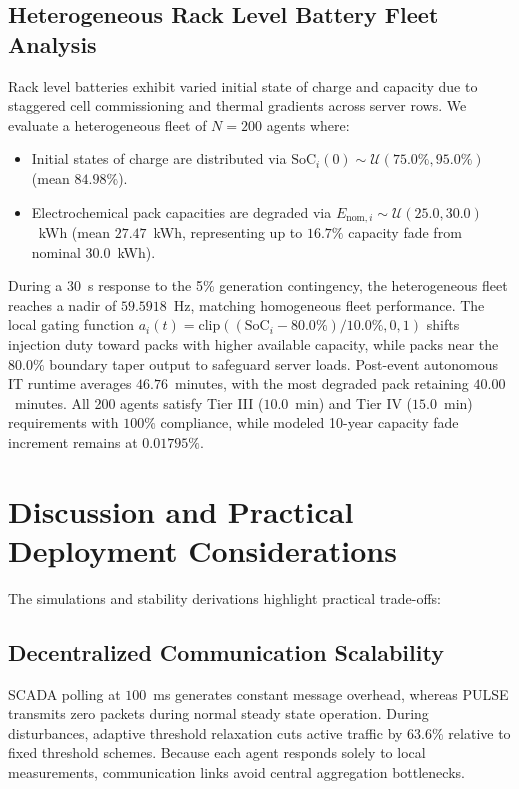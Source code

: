 \documentclass[preprint,12pt]{elsarticle}
\begin{document}
\subsection{Heterogeneous Rack Level Battery Fleet Analysis}
\label{sec:res_exp_b}

Rack level batteries exhibit varied initial state of charge and capacity due to staggered cell commissioning and thermal gradients across server rows. We evaluate a heterogeneous fleet of $N=200$ agents where:
\begin{itemize}
    \item Initial states of charge are distributed via $\mathrm{SoC}_{i}(0) \sim \mathcal{U}(75.0\%, 95.0\%)$ (mean $84.98\%$).
    \item Electrochemical pack capacities are degraded via $E_{\mathrm{nom}, i} \sim \mathcal{U}(25.0, 30.0)$~kWh (mean $27.47$~kWh, representing up to $16.7\%$ capacity fade from nominal $30.0$~kWh).
\end{itemize}

During a 30~s response to the 5\% generation contingency, the heterogeneous fleet reaches a nadir of $59.5918$~Hz, matching homogeneous fleet performance. The local gating function $a_i(t) = \mathrm{clip}((\mathrm{SoC}_i - 80.0\%)/10.0\%, 0, 1)$ shifts injection duty toward packs with higher available capacity, while packs near the $80.0\%$ boundary taper output to safeguard server loads. Post-event autonomous IT runtime averages $46.76$~minutes, with the most degraded pack retaining $40.00$~minutes. All 200 agents satisfy Tier III ($10.0$~min) and Tier IV ($15.0$~min) requirements with $100\%$ compliance, while modeled 10-year capacity fade increment remains at $0.01795\%$.

\section{Discussion and Practical Deployment Considerations}
\label{sec:discussion}

The simulations and stability derivations highlight practical trade-offs:

\subsection{Decentralized Communication Scalability}
\label{sec:disc_comm}
SCADA polling at $100$~ms generates constant message overhead, whereas PULSE transmits zero packets during normal steady state operation. During disturbances, adaptive threshold relaxation cuts active traffic by $63.6\%$ relative to fixed threshold schemes. Because each agent responds solely to local measurements, communication links avoid central aggregation bottlenecks.
\end{document}
